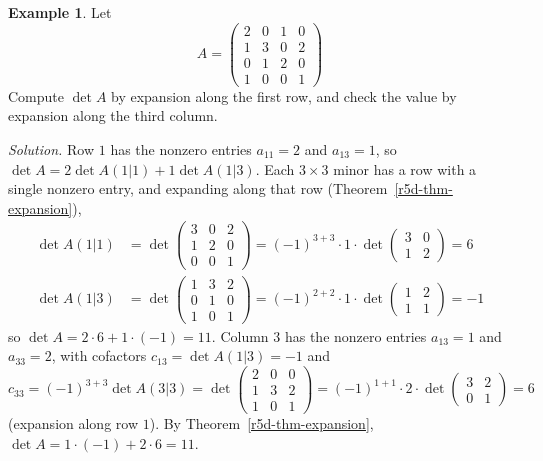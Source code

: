 \documentclass[12pt]{article}
\theoremstyle{definition}
\newtheorem{example}[theorem]{Example}
\begin{document}
\begin{example}\label{r5d-exm-expansion}
Let
\[
A=\begin{pmatrix}2&0&1&0\\1&3&0&2\\0&1&2&0\\1&0&0&1\end{pmatrix}
\]
Compute \(\det A\) by expansion along the first row, and check the value by expansion along the third column.

\textit{Solution.} Row \(1\) has the nonzero entries \(a_{11}=2\) and \(a_{13}=1\), so
\(\det A=2\det A(1|1)+1\det A(1|3)\). Each \(3\times3\) minor has a row with a single nonzero
entry, and expanding along that row (Theorem~\ref{r5d-thm-expansion}),
\[
\begin{aligned}
\det A(1|1)&=\det\begin{pmatrix}3&0&2\\1&2&0\\0&0&1\end{pmatrix}=(-1)^{3+3}\cdot1\cdot\det\begin{pmatrix}3&0\\1&2\end{pmatrix}=6\\
\det A(1|3)&=\det\begin{pmatrix}1&3&2\\0&1&0\\1&0&1\end{pmatrix}=(-1)^{2+2}\cdot1\cdot\det\begin{pmatrix}1&2\\1&1\end{pmatrix}=-1
\end{aligned}
\]
so \(\det A=2\cdot6+1\cdot(-1)=11\). Column \(3\) has the nonzero entries \(a_{13}=1\) and
\(a_{33}=2\), with cofactors \(c_{13}=\det A(1|3)=-1\) and
\[
c_{33}=(-1)^{3+3}\det A(3|3)=\det\begin{pmatrix}2&0&0\\1&3&2\\1&0&1\end{pmatrix}
=(-1)^{1+1}\cdot2\cdot\det\begin{pmatrix}3&2\\0&1\end{pmatrix}=6
\]
(expansion along row \(1\)). By Theorem~\ref{r5d-thm-expansion},
\(\det A=1\cdot(-1)+2\cdot6=11\).
\end{example}
\end{document}
